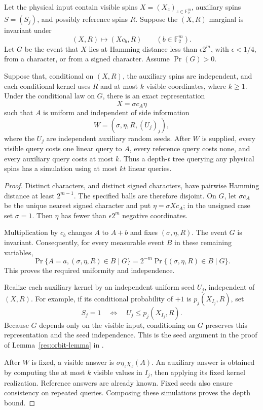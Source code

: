 \begin{proposition}\label{ian:adaptive-character-all-spin-simulation}
Let the physical input contain visible spins \(X=(X_z)_{z\in\mathbb F_2^m}\), auxiliary spins \(S=(S_j)\), and possibly reference spins \(R\). Suppose the \((X,R)\) marginal is invariant under
\[
 (X,R)\longmapsto(Xc_b,R)\qquad(b\in\mathbb F_2^m).
\]
Let \(G\) be the event that \(X\) lies at Hamming distance less than \(\epsilon 2^m\), with \(\epsilon<1/4\), from a character, or from a signed character. Assume \(\Pr(G)>0\).

Suppose that, conditional on \((X,R)\), the auxiliary spins are independent, and each conditional kernel uses \(R\) and at most \(k\) visible coordinates, where \(k\ge1\). Under the conditional law on \(G\), there is an exact representation
\[
 X=\sigma c_A\eta
\]
such that \(A\) is uniform and independent of side information
\[
 W=(\sigma,\eta,R,(U_j)_j),
\]
where the \(U_j\) are independent auxiliary random seeds. After \(W\) is supplied, every visible query costs one linear query to \(A\), every reference query costs none, and every auxiliary query costs at most \(k\). Thus a depth-\(t\) tree querying any physical spins has a simulation using at most \(kt\) linear queries.
\end{proposition}
\begin{proof}
Distinct characters, and distinct signed characters, have pairwise Hamming distance at least \(2^{m-1}\). The specified balls are therefore disjoint. On \(G\), let \(\sigma c_A\) be the unique nearest signed character and put
\(\eta=\sigma Xc_A\); in the unsigned case set \(\sigma=1\).
Then \(\eta\) has fewer than \(\epsilon2^m\) negative coordinates.

Multiplication by \(c_b\) changes \(A\) to \(A+b\) and fixes
\((\sigma,\eta,R)\). The event \(G\) is invariant. Consequently, for every measurable event \(B\) in these remaining variables,
\[
 \Pr\{A=a,(\sigma,\eta,R)\in B\mid G\}
 =
 2^{-m}\Pr\{(\sigma,\eta,R)\in B\mid G\}.
\]
This proves the required uniformity and independence.

Realize each auxiliary kernel by an independent uniform seed \(U_j\), independent of \((X,R)\). For example, if its conditional probability of \(+1\) is \(p_j(X_{I_j},R)\), set
\[
 S_j=1\quad\Longleftrightarrow\quad
 U_j\le p_j(X_{I_j},R).
\]
Because \(G\) depends only on the visible input, conditioning on \(G\) preserves this representation and the seed independence. This is the seed argument in the proof of Lemma~\ref{res:orbit-lemma} in
.

After \(W\) is fixed, a visible answer is
\(\sigma\eta_z\chi_z(A)\). An auxiliary answer is obtained by computing the at most \(k\) visible values in \(I_j\), then applying its fixed kernel realization. Reference answers are already known. Fixed seeds also ensure consistency on repeated queries. Composing these simulations proves the depth bound.
\end{proof}

